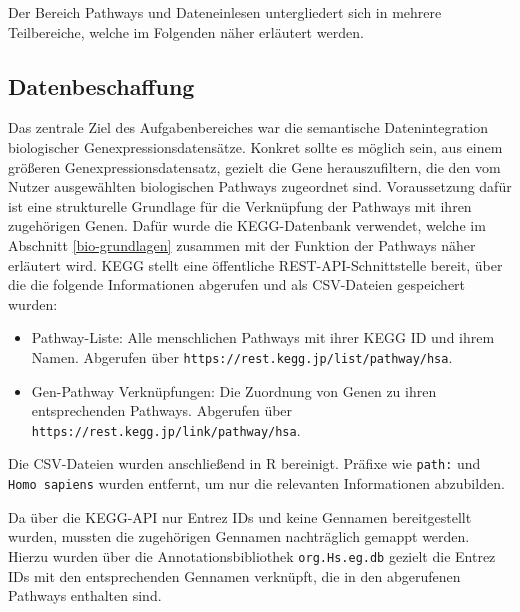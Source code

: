 \documentclass[12pt]{article}
\begin{document}
\noindent Der Bereich Pathways und Dateneinlesen untergliedert sich in mehrere Teilbereiche, welche im Folgenden näher erläutert werden.

\subsection{Datenbeschaffung}
Das zentrale Ziel des Aufgabenbereiches war die semantische Datenintegration biologischer Genexpressionsdatensätze. Konkret sollte es möglich sein, aus einem größeren Genexpressionsdatensatz, gezielt die Gene herauszufiltern, die den vom Nutzer ausgewählten biologischen Pathways zugeordnet sind.
Voraussetzung dafür ist eine strukturelle Grundlage für die Verknüpfung der Pathways mit ihren zugehörigen Genen. Dafür wurde die KEGG-Datenbank verwendet, welche im Abschnitt \ref{bio-grundlagen} zusammen mit der Funktion der Pathways näher erläutert wird. KEGG stellt eine öffentliche REST-API-Schnittstelle bereit, über die die folgende Informationen abgerufen und als CSV-Dateien gespeichert wurden: 
\begin{itemize}
	\item Pathway-Liste: Alle menschlichen Pathways mit ihrer KEGG ID und ihrem Namen. Abgerufen über \texttt{https://\allowbreak rest.\allowbreak kegg.\allowbreak jp/\allowbreak list/\allowbreak pathway/\allowbreak hsa}.
	\item Gen-Pathway Verknüpfungen: Die Zuordnung von Genen zu ihren entsprechenden Pathways. Abgerufen über \texttt{https://\allowbreak rest.\allowbreak kegg.\allowbreak jp/\allowbreak link/\allowbreak pathway/\allowbreak hsa}.
\end{itemize}
\noindent Die CSV-Dateien wurden anschließend in R bereinigt. Präfixe wie \texttt{path:} und \texttt{Homo sapiens} wurden entfernt, um nur die relevanten Informationen abzubilden. 

\noindent Da über die KEGG-API nur Entrez IDs und keine Gennamen bereitgestellt wurden, mussten die zugehörigen Gennamen nachträglich gemappt werden. Hierzu wurden über die Annotationsbibliothek \texttt{org.Hs.eg.db} gezielt die Entrez IDs mit den entsprechenden Gennamen verknüpft, die in den abgerufenen Pathways enthalten sind.
\end{document}
